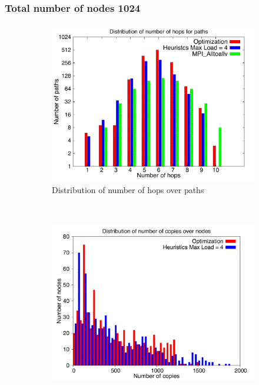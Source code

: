 \documentclass[letter]{article}
\begin{document}
\clearpage
\newpage

\subsubsection{Total number of nodes 1024}



\begin{figure}[!htbp]
        \centering
        \begin{subfigure}[b]{0.49\textwidth}
                \includegraphics[width=\textwidth]{report_figures/1k/hop_histo.pdf}
                \caption{Distribution of number of hops over paths}
                \label{fig:1k_hop}
        \end{subfigure}%
        ~ %
        \begin{subfigure}[b]{0.49\textwidth}
                \includegraphics[width=\textwidth]{report_figures/1k/copy_histo.pdf}

\end{subfigure}
\end{figure}
\end{document}
